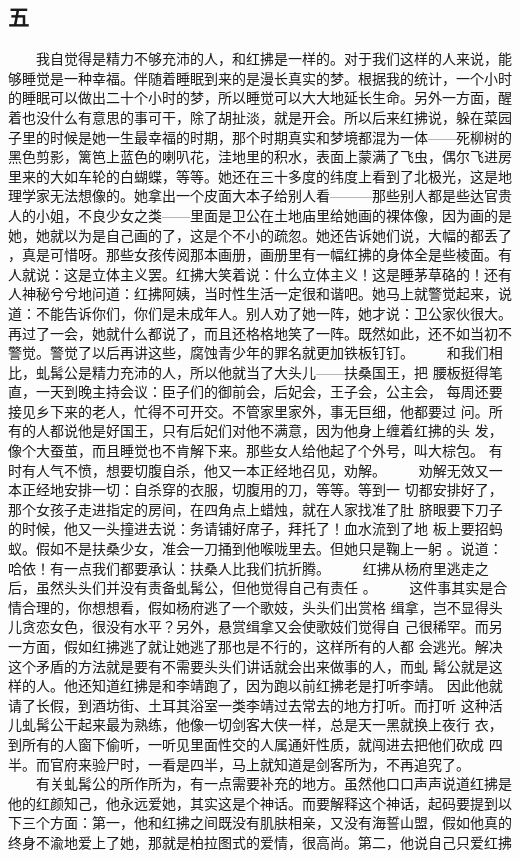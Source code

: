 
\subsection{五} 
 
 　　我自觉得是精力不够充沛的人，和红拂是一样的。对于我们这样的人来说，能 够睡觉是一种幸福。伴随着睡眠到来的是漫长真实的梦。根据我的统计，一个小时 的睡眠可以做出二十个小时的梦，所以睡觉可以大大地延长生命。另外一方面，醒 着也没什么有意思的事可干，除了胡扯淡，就是开会。所以后来红拂说，躲在菜园 子里的时候是她一生最幸福的时期，那个时期真实和梦境都混为一体——死柳树的 黑色剪影，篱笆上蓝色的喇叭花，洼地里的积水，表面上蒙满了飞虫，偶尔飞进房 里来的大如车轮的白蝴蝶，等等。她还在三十多度的纬度上看到了北极光，这是地 理学家无法想像的。她拿出一个皮面大本子给别人看———那些别人都是些达官贵 人的小姐，不良少女之类——里面是卫公在土地庙里给她画的裸体像，因为画的是 她，她就以为是自己画的了，这是个不小的疏忽。她还告诉她们说，大幅的都丢了 ，真是可惜呀。那些女孩传阅那本画册，画册里有一幅红拂的身体全是些棱面。有 人就说：这是立体主义罢。红拂大笑着说：什么立体主义！这是睡茅草硌的！还有 人神秘兮兮地问道：红拂阿姨，当时性生活一定很和谐吧。她马上就警觉起来，说 道：不能告诉你们，你们是未成年人。别人劝了她一阵，她才说：卫公家伙很大。 再过了一会，她就什么都说了，而且还格格地笑了一阵。既然如此，还不如当初不 警觉。警觉了以后再讲这些，腐蚀青少年的罪名就更加铁板钉钉。 　　和我们相比，虬髯公是精力充沛的人，所以他就当了大头儿——扶桑国王，把 腰板挺得笔直，一天到晚主持会议：臣子们的御前会，后妃会，王子会，公主会， 每周还要接见乡下来的老人，忙得不可开交。不管家里家外，事无巨细，他都要过 问。所有的人都说他是好国王，只有后妃们对他不满意，因为他身上缠着红拂的头 发，像个大蚕茧，而且睡觉也不肯解下来。那些女人给他起了个外号，叫大棕包。 有时有人气不愤，想要切腹自杀，他又一本正经地召见，劝解。 　　劝解无效又一本正经地安排一切：自杀穿的衣服，切腹用的刀，等等。等到一 切都安排好了，那个女孩子走进指定的房间，在四角点上蜡烛，就在人家找准了肚 脐眼要下刀子的时候，他又一头撞进去说：务请铺好席子，拜托了！血水流到了地 板上要招蚂蚁。假如不是扶桑少女，准会一刀捅到他喉咙里去。但她只是鞠上一躬 。说道：哈依！有一点我们都要承认：扶桑人比我们抗折腾。 　　红拂从杨府里逃走之后，虽然头头们并没有责备虬髯公，但他觉得自己有责任 。 　　这件事其实是合情合理的，你想想看，假如杨府逃了一个歌妓，头头们出赏格 缉拿，岂不显得头儿贪恋女色，很没有水平？另外，悬赏缉拿又会使歌妓们觉得自 己很稀罕。而另一方面，假如红拂逃了就让她逃了那也是不行的，这样所有的人都 会逃光。解决这个矛盾的方法就是要有不需要头头们讲话就会出来做事的人，而虬 髯公就是这样的人。他还知道红拂是和李靖跑了，因为跑以前红拂老是打听李靖。 因此他就请了长假，到酒坊街、土耳其浴室一类李靖过去常去的地方打听。而打听 这种活儿虬髯公干起来最为熟练，他像一切剑客大侠一样，总是天一黑就换上夜行 衣，到所有的人窗下偷听，一听见里面性交的人属通奸性质，就闯进去把他们砍成 四半。而官府来验尸时，一看是四半，马上就知道是剑客所为，不再追究了。 　　有关虬髯公的所作所为，有一点需要补充的地方。虽然他口口声声说道红拂是 他的红颜知己，他永远爱她，其实这是个神话。而要解释这个神话，起码要提到以 下三个方面：第一，他和红拂之间既没有肌肤相亲，又没有海誓山盟，假如他真的 终身不渝地爱上了她，那就是柏拉图式的爱情，很高尚。第二，他说自己只爱红拂 